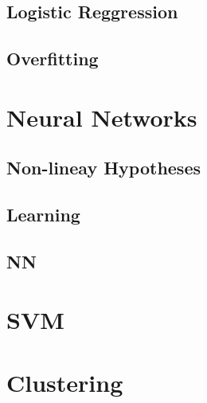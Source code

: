 \documentclass[en,11pt,english,black,simple,device=ppt]{elegantbook}
\begin{document}
\section{Logistic Reggression}



\section{Overfitting}



\chapter{Neural Networks}

\section{Non-lineay Hypotheses}



\section{Learning}



\section{NN}





\chapter{SVM}




\chapter{Clustering}


\end{document}
